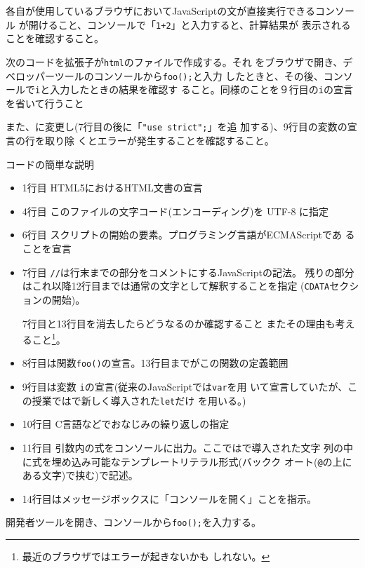 \begin{Prob}\upshape
 各自が使用しているブラウザにおいてJavaScriptの文が直接実行できるコンソール
 が開けること、コンソールで「\texttt{1+2}」と入力すると、計算結果が
 表示されることを確認すること。
\end{Prob}
\begin{Prob}\label{FisatJS}\upshape
 次のコードを拡張子が\Verb+html+のファイルで作成する。それ
 をブラウザで開き、デベロッパーツールのコンソールから\Verb+foo();+と入力
 したときと、その後、コンソールで\texttt{i}と入力したときの結果を確認す
 ること。{同様のことを９行目の\Verb+i+の宣言を省いて行うこと}

 また、\Strict に変更し(7行目の後に「\Verb+"use strict";+」を追
 加する)、9行目の変数の宣言の行を取り除
 くとエラーが発生することを確認すること。
\end{Prob}
コードの簡単な説明
\begin{itemize}
 \item 1行目 HTML5におけるHTML文書の宣言
 \item 4行目 このファイルの文字コード(エンコーディング)を UTF-8 に指定
 \item 6行目 スクリプトの開始の要素。プログラミング言語がECMAScriptであ
       ることを宣言
 \item 7行目 \texttt{//}は行末までの部分をコメントにするJavaScriptの記法。
残りの部分はこれ以降12行目までは通常の文字として解釈することを指定
       (\texttt{CDATA}セクションの開始)。

      7行目と13行目を消去したらどうなるのか確認すること
またその理由も考えること\footnote{最近のブラウザではエラーが起きないかも
       しれない。}。
 \item 8行目は関数\Verb+foo()+の宣言。13行目までがこの関数の定義範囲
 \item 9行目は変数 \texttt{i}の宣言(従来のJavaScriptでは\texttt{var}を用
       いて宣言していたが、この授業では\ES で新しく導入された\texttt{let}だけ
       を用いる。)
 \item 10行目 C言語などでおなじみの繰り返しの指定
 \item 11行目 引数内の式をコンソールに出力。ここでは\ES で導入された文字
       列の中に式を埋め込み可能なテンプレートリテラル形式(バックク
       オート(\Verb+@+の上にある文字)で挟む)で記述。
 \item 14行目はメッセージボックスに「コンソールを開く」ことを指示。
\end{itemize}
開発者ツールを開き、コンソールから\Verb+foo();+を入力する。

